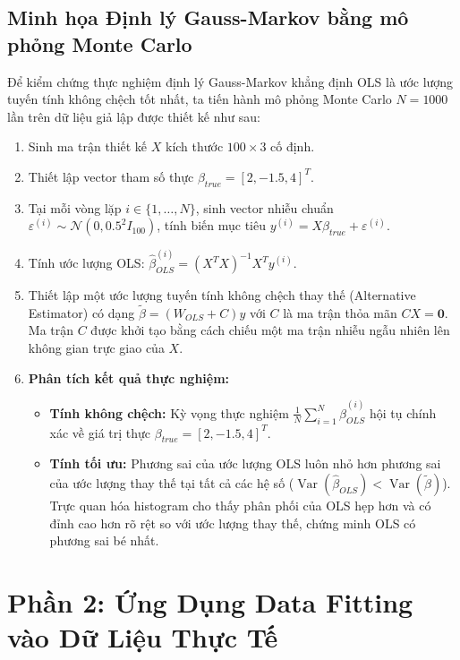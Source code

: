 \documentclass[12pt,a4paper]{article}
\begin{document}
\subsection{Minh họa Định lý Gauss-Markov bằng mô phỏng Monte Carlo}
Để kiểm chứng thực nghiệm định lý Gauss-Markov khẳng định OLS là ước lượng tuyến tính không chệch tốt nhất, ta tiến hành mô phỏng Monte Carlo $N = 1000$ lần trên dữ liệu giả lập được thiết kế như sau:
\begin{enumerate}
    \item Sinh ma trận thiết kế $X$ kích thước $100 \times 3$ cố định.
    \item Thiết lập vector tham số thực $\beta_{true} = [2, -1.5, 4]^T$.
    \item Tại mỗi vòng lặp $i \in \{1, \dots, N\}$, sinh vector nhiễu chuẩn $\varepsilon^{(i)} \sim \mathcal{N}(0, 0.5^2 I_{100})$, tính biến mục tiêu $y^{(i)} = X\beta_{true} + \varepsilon^{(i)}$.
    \item Tính ước lượng OLS: $\hat{\beta}_{OLS}^{(i)} = (X^T X)^{-1} X^T y^{(i)}$.
    \item Thiết lập một ước lượng tuyến tính không chệch thay thế (Alternative Estimator) có dạng $\tilde{\beta} = (W_{OLS} + C) y$ với $C$ là ma trận thỏa mãn $CX = \mathbf{0}$. Ma trận $C$ được khởi tạo bằng cách chiếu một ma trận nhiễu ngẫu nhiên lên không gian trực giao của $X$.
    \item \textbf{Phân tích kết quả thực nghiệm:}
    \begin{itemize}
        \item \textbf{Tính không chệch:} Kỳ vọng thực nghiệm $\frac{1}{N} \sum_{i=1}^N \hat{\beta}_{OLS}^{(i)}$ hội tụ chính xác về giá trị thực $\beta_{true} = [2, -1.5, 4]^T$.
        \item \textbf{Tính tối ưu:} Phương sai của ước lượng OLS luôn nhỏ hơn phương sai của ước lượng thay thế tại tất cả các hệ số ($\operatorname{Var}(\hat{\beta}_{OLS}) < \operatorname{Var}(\tilde{\beta})$). Trực quan hóa histogram cho thấy phân phối của OLS hẹp hơn và có đỉnh cao hơn rõ rệt so với ước lượng thay thế, chứng minh OLS có phương sai bé nhất.
    \end{itemize}
\end{enumerate}

\clearpage

\section{Phần 2: Ứng Dụng Data Fitting vào Dữ Liệu Thực Tế}
\end{document}
